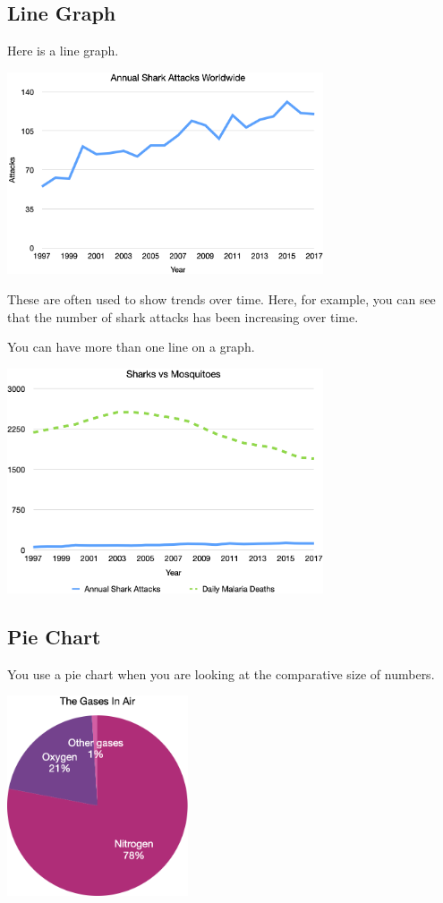 \subsection{Line Graph}

Here is a line graph.

\includegraphics[width=0.7\textwidth]{SharksLine1.png}

These are often used to show trends over time. Here, for example, you
can see that the number of shark attacks has been increasing over
time.

You can have more than one line on a graph.

\includegraphics[width=0.7\textwidth]{SharksVsMosquitoes.png}

\subsection{Pie Chart}

You use a pie chart when you are looking at the comparative size of numbers.

\includegraphics[width=0.4\textwidth]{AirPie.png}

